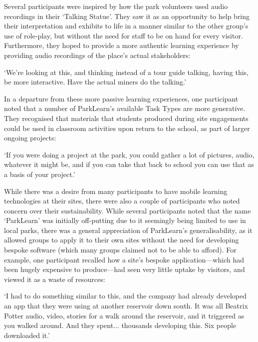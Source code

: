 Several participants were inspired by how the park volunteers used audio recordings in their `Talking Statue'. They saw it as an opportunity to help bring their interpretation and exhibits to life in a manner similar to the other group's use of role-play, but without the need for staff to be on hand for every visitor. Furthermore, they hoped to provide a more authentic learning experience by providing audio recordings of the place's actual stakeholders:

\begin{displayquote}
`We're looking at this, and thinking instead of a tour guide talking, having this, be more interactive. Have the actual miners do the talking.'
\end{displayquote}

In a departure from these more passive learning experiences, one participant noted that a number of ParkLearn's available Task Types are more generative. They recognised that materials that students produced during site engagements could be used in classroom activities upon return to the school, as part of larger ongoing projects:

\begin{displayquote}
`If you were doing a project at the park, you could gather a lot of pictures, audio, whatever it might be, and if you can take that back to school you can use that as a basis of your project.'
\end{displayquote}

While there was a desire from many participants to have mobile learning technologies at their sites, there were also a couple of participants who noted concern over their sustainability. While several participants noted that the name `ParkLearn' was initially off-putting due to it seemingly being limited to use in local parks, there was a general appreciation of ParkLearn's generalisability, as it allowed groups to apply it to their own sites without the need for developing bespoke software (which many groups claimed not to be able to afford). For example, one participant recalled how a site's bespoke application---which had been hugely expensive to produce---had seen very little uptake by visitors, and viewed it as a waste of resources:

\begin{displayquote}
`I had to do something similar to this, and the company had already developed an app that they were using at another reservoir down south. It was all Beatrix Potter audio, video, stories for a walk around the reservoir, and it triggered as you walked around. And they spent... thousands developing this. Six people downloaded it.'
\end{displayquote}

